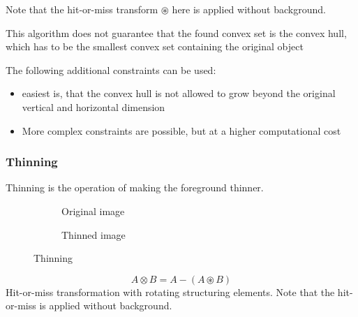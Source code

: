 Note that the hit-or-miss transform $\circledast$ here is applied without background.

This algorithm does not guarantee that the found convex set is the convex hull, which has to be the smallest convex set containing the original object

The following additional constraints can be used:
\begin{itemize}
\item easiest is, that the convex hull is not allowed to grow beyond the original vertical and horizontal dimension
\item More complex constraints are possible, but at a higher computational cost
\end{itemize}

\subsubsection{Thinning}
Thinning is the operation of making the foreground thinner.
\begin{figure}[h]
	\centering
	\begin{subfigure}[b]{0.45\textwidth}
		\centering
		\caption{Original image}
	\end{subfigure}
	\begin{subfigure}[b]{0.45\textwidth}
		\centering
		\caption{Thinned image}
	\end{subfigure}
	\caption{Thinning}
\end{figure}
	\[
		A \otimes  B = A - (A \circledast B)
	\]
Hit-or-miss transformation with rotating structuring elements. Note that the hit-or-miss is applied without background. \\

